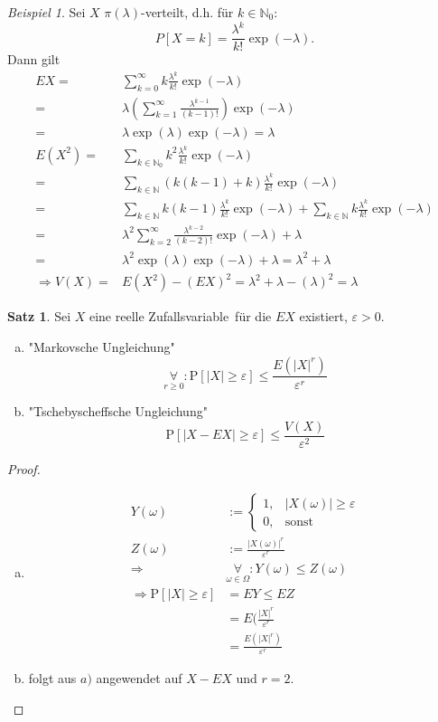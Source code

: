 \documentclass[a4paper,12pt,fleqn]{scrartcl}
\newcommand{\N}{\mathbb{N}}
\newcommand{\ZV}{Zufallsvariable}
\newcommand{\impl}{\Rightarrow}
\newcommand{\fa}[1]{\mathop{\forall}\limits_{#1}}
\theoremstyle{definition}
\newtheorem{satz}[definition]{Satz}
\theoremstyle{plain}
\theoremstyle{remark}
\newtheorem{beispiel}[definition]{Beispiel}
\begin{document}
\begin{beispiel}
Sei $X$ $\pi(\lambda)$-verteilt, d.h. für $k\in\N_0$:
\[P[X=k]=\frac{\lambda^k}{k!}\exp(-\lambda).\]
Dann gilt
\begin{align*}
EX=&\sum_{k=0}^{\infty}k\frac{\lambda^k}{k!}\exp(-\lambda)\\
=&\lambda(\sum_{k=1}^{\infty}\frac{\lambda^{k-1}}{(k-1)!})\exp(-\lambda)\\
=&\lambda\exp(\lambda)\exp(-\lambda)=\lambda\\
E(X^2)=&\sum_{k\in\N_0}k^2\frac{\lambda^k}{k!}\exp(-\lambda)\\
=&\sum_{k\in\N}(k(k-1)+k)\frac{\lambda^k}{k!}\exp(-\lambda)\\
=&\sum_{k\in\N}k(k-1)\frac{\lambda^k}{k!}\exp(-\lambda)+\sum_{k\in\N}k\frac{\lambda^k}{k!}\exp(-\lambda)\\
=&\lambda^2\sum_{k=2}^{\infty}\frac{\lambda^{k-2}}{(k-2)!}\exp(-\lambda)+\lambda\\
=&\lambda^2\exp(\lambda)\exp(-\lambda)+\lambda=\lambda^2+\lambda\\
\impl V(X)=&E(X^2)-(EX)^2=\lambda^2+\lambda-(\lambda)^2=\lambda
\end{align*}
\end{beispiel}
\begin{satz}
Sei $X$ eine reelle \ZV \, für die $EX$ existiert, $\varepsilon>0$.
\begin{enumerate}[a)]
\item "Markovsche Ungleichung"
\[\fa{r\geq 0}:\text{P}[|X|\geq\varepsilon]\leq\frac{E(|X|^r)}{\varepsilon^r}\]
\item "Tschebyscheffsche Ungleichung"
\[\text{P}[|X-EX|\geq\varepsilon]\leq\frac{V(X)}{\varepsilon^2}\]
\end{enumerate}
\end{satz}
\begin{proof}
\begin{enumerate}[a)]
\item \begin{align*}
Y(\omega)&:=\begin{cases}1,&|X(\omega)|\geq\varepsilon\\
0,&\text{sonst}
\end{cases}\\
Z(\omega)&:=\frac{|X(\omega)|^r}{\varepsilon^r}\\
\impl&\fa{\omega\in\Omega}:Y(\omega)\leq Z(\omega)\\
\impl \text{P}[|X|\geq\varepsilon]&=EY\leq EZ \tag{Monotonie Erwartungswert}\\
&=E(\frac{|X|^r}{\varepsilon^r}\\
&=\frac{E(|X|^r)}{\varepsilon^r}
\end{align*}
\item folgt aus $a)$ angewendet auf $X-EX$ und $r=2$.
\end{enumerate}
\end{proof}
\end{document}
